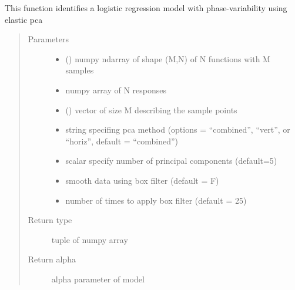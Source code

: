 \documentclass[letterpaper,10pt,english]{sphinxmanual}
\begin{document}
\begin{fulllineitems}
\label{\detokenize{pcr_regression:pcr_regression.elastic_mlpcr_regression}}
This function identifies a logistic regression model with phase-variability
using elastic pca
\begin{quote}\begin{description}
\item[{Parameters}] \leavevmode\begin{itemize}
\item {} 
 () \textendash{} numpy ndarray of shape (M,N) of N functions with M samples

\item {} 
 \textendash{} numpy array of N responses

\item {} 
 () \textendash{} vector of size M describing the sample points

\item {} 
 \textendash{} string specifing pca method (options = “combined”,
“vert”, or “horiz”, default = “combined”)

\item {} 
 \textendash{} scalar specify number of principal components (default=5)

\item {} 
 \textendash{} smooth data using box filter (default = F)

\item {} 
 \textendash{} number of times to apply box filter (default = 25)

\end{itemize}

\item[{Return type}] \leavevmode
tuple of numpy array

\item[{Return alpha}] \leavevmode
alpha parameter of model


\end{description}
\end{quote}
\end{fulllineitems}
\end{document}
